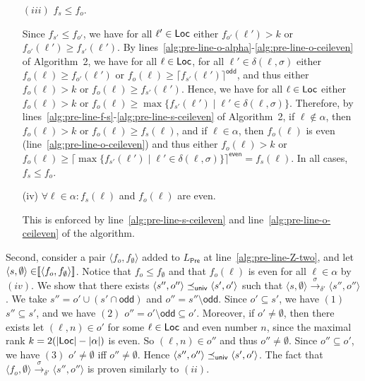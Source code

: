 \documentclass{LMCS}
\def\sg{\mathrel[\joinrel\mathrel[}
\def\sd{\mathrel]\joinrel\mathrel]}
\def\abs#1{\ensuremath{\lvert #1\rvert}}
\newcommand{\Pre}{\mathsf{Pre}}
\newcommand{\sem}[1]{\sg \mathrel{#1} \sd}
\renewcommand{\l}{{\ell}}
\newcommand{\Loc}{{\sf Loc}}
\newcommand{\tuple}[1]{\langle #1 \rangle}
\newcommand{\odd}{\mathsf{odd}}
\newcommand{\ceilOdd}[1]{\lceil \mathrel {#1} \rceil^{\mathsf{odd}}}
\newcommand{\ceilEven}[1]{\lceil \mathrel {#1} \rceil^{\mathsf{ even}}}
\begin{document}
\begin{enumerate}[$(i)$]
\item[$(iii)$] $f_s \leq f_o$.

Since $f_{s'} \leq f_{o'}$, we have for all $\l' \in \Loc$ either 
$f_{o'}(\l') > k$ or $f_{o'}(\l') \geq f_{s'}(\l')$.
By lines~\ref{alg:pre-line-o-alpha}-\ref{alg:pre-line-o-ceileven} of Algorithm~2,
we have for all $\l \in \Loc$, for all $\l' \in \delta(\l,\sigma)$ 
either $f_o(\l) \geq f_{o'}(\l')$ or $f_o(\l) \geq \ceilOdd{f_{s'}(\l')}$,
and thus either $f_o(\l) > k$ or $f_o(\l) \geq f_{s'}(\l')$. 
Hence, we have for all $\l \in \Loc$ either $f_o(\l) > k$ or 
$f_o(\l) \geq \max \{f_{s'}(\l') \mid \l' \in \delta(\l,\sigma) \}$.
Therefore, by lines~\ref{alg:pre-line-f-s}-\ref{alg:pre-line-s-ceileven} of 
Algorithm~2, if $\l \not\in \alpha$, then $f_o(\l) > k$ or $f_o(\l) \geq f_{s}(\l)$,
and if $\l \in \alpha$, then $f_o(\l)$ is even (line~\ref{alg:pre-line-o-ceileven})
and thus either $f_o(\l) > k$ or $f_o(\l) \geq \ceilEven{\max \{f_{s'}(\l') \mid \l' \in \delta(\l,\sigma) \}} = f_{s}(\l)$.
In all cases, $f_s \leq f_o$.

\item[(iv)] $\forall \l \in \alpha: f_s(\l)$ and $f_o(\l)$ are even. 

This is enforced by line~\ref{alg:pre-line-s-ceileven} and line~\ref{alg:pre-line-o-ceileven} of the algorithm.
\end{enumerate}


\noindent Second, consider a pair $\tuple{f_o,f_{\emptyset}}$ added to
$L_{\Pre}$ at line~\ref{alg:pre-line-Z-two}, and let
$\tuple{s,\emptyset} \in \sem{\tuple{f_o,f_{\emptyset}}}$.  Notice
that $f_o \leq f_{\emptyset}$ and that $f_o(\l)$ is even for all $\l
\in \alpha$ by $(iv)$.  We show that there exists $\tuple{s'',o''}
\preceq_{{\sf univ}} \tuple{s',o'}$ such that $\tuple{s,\emptyset}
\xrightarrow{\sigma}_{\delta'} \tuple{s'',o''}$.  We take $s'' = o'
\cup (s' \cap \odd)$ and $o'' = s'' \setminus \odd$.  Since $o'
\subseteq s'$, we have $(1)$ $s'' \subseteq s'$, and we have $(2)$
$o'' = o' \setminus \odd \subseteq o'$.  Moreover, if $o' \neq
\emptyset$, then there exists let $(\l,n) \in o'$ for some $\l \in
\Loc$ and even number $n$, since the maximal rank $k = 2(\abs{\Loc} -
\abs{\alpha})$ is even. So $(\l,n) \in o''$ and thus $o'' \neq
\emptyset$.  Since $o'' \subseteq o'$, we have $(3)$ $o' \neq
\emptyset$ iff $o'' \neq \emptyset$.  Hence $\tuple{s'',o''}
\preceq_{{\sf univ}} \tuple{s',o'}$. The fact that
$\tuple{f_o,\emptyset} \xrightarrow{\sigma}_{\delta'} \tuple{s'',o''}$
is proven similarly to $(ii)$.
\end{document}
